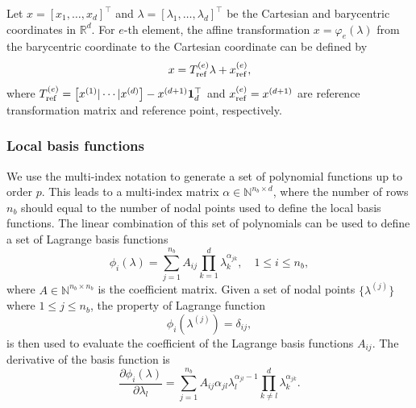 \documentclass[a4paper,11pt]{scrartcl}
\newcommand{\R}{\mathbb{R}}
\newcommand{\N}{\mathbb{N}}
\newcommand{\eq}[1]{\begin{equation} #1 \end{equation}}
\newcommand{\eqs}[1]{\begin{align} #1 \end{align}}
\begin{document}
Let $x = [x_1, \ldots, x_d]^\top$ and $\lambda = [\lambda_1, \ldots, \lambda_d]^\top$ be the Cartesian and barycentric coordinates in $\R^d$.
%
%
For $e$-th element, the affine transformation $x = \varphi_e (\lambda)$ from the barycentric coordinate to the Cartesian coordinate can be defined by
\eq{
x =  T^{(e)}_{\rm ref} \lambda + x^{(e)}_{\rm ref} \label{eq:l2g} ,
}
where $T^{(e)}_{\rm ref} = \left[ x^{(1)} \vert \cdots \vert  x^{(d)} \right] -  x^{(d+1)} {\bf 1}_d^\top$ and $x^{(e)}_{\rm ref} = x^{(d+1)}$ are reference transformation matrix and reference point, respectively.

\subsubsection{Local basis functions}

We use the multi-index notation to generate a set of polynomial functions up to order $p$. This leads to a multi-index matrix $\alpha \in \N^{n_b \times d}$, where the number of rows $n_b$ should equal to the number of nodal points used to define the local basis functions.
%
The linear combination of this set of polynomials can be used to define a set of Lagrange  basis functions
\eq{
\phi_i(\lambda) = \sum_{j=1}^{n_b} A_{ij} \prod_{k=1}^{d} \lambda_k^{\alpha_{jk}}, \quad 1 \leq i \leq n_b,
}
where $A\in \N^{n_b \times n_b}$ is the coefficient matrix.
%
Given a set of nodal points $\{\lambda^{(j)}\}$ where $1 \leq j \leq n_b$, the property of Lagrange function
\eq{
\phi_i(\lambda^{(j)}) = \delta_{ij},
}
is then used to evaluate the coefficient of the Lagrange basis functions $A_{ij}$.
%
The derivative of the basis function is
\eq{
\frac{\partial \phi_i(\lambda)}{\partial \lambda_l} = \sum_{j=1}^{n_b} A_{ij} \alpha_{jl} \lambda_l^{\alpha_{jl} - 1} \prod_{k \neq l}^{d} \lambda_k^{\alpha_{jk}}.
}
\end{document}
